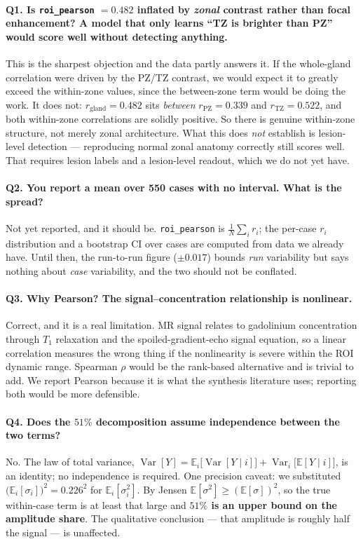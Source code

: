 \documentclass[11pt]{article}
\newcommand{\Var}{\operatorname{Var}}
\newcommand{\Ex}{\mathbb{E}}
\newcommand{\1}{\mathbb{1}}
\begin{document}
\paragraph{Q1. Is \texttt{roi\_pearson} $=0.482$ inflated by \emph{zonal} contrast rather
than focal enhancement? A model that only learns ``TZ is brighter than PZ'' would score well
without detecting anything.}
This is the sharpest objection and the data partly answers it. If the whole-gland correlation
were driven by the PZ/TZ contrast, we would expect it to greatly exceed the within-zone
values, since the between-zone term would be doing the work. It does not:
$r_{\text{gland}}=0.482$ sits \emph{between} $r_{\text{PZ}}=0.339$ and $r_{\text{TZ}}=0.522$,
and both within-zone correlations are solidly positive. So there is genuine within-zone
structure, not merely zonal architecture. What this does \emph{not} establish is
lesion-level detection --- reproducing normal zonal anatomy correctly still scores well.
That requires lesion labels and a lesion-level readout, which we do not yet have.

\paragraph{Q2. You report a mean over 550 cases with no interval. What is the spread?}
Not yet reported, and it should be. \texttt{roi\_pearson} is $\tfrac1N\sum_i r_i$; the
per-case $r_i$ distribution and a bootstrap CI over cases are computed from data we already
have. Until then, the run-to-run figure ($\pm0.017$) bounds \emph{run} variability but says
nothing about \emph{case} variability, and the two should not be conflated.

\paragraph{Q3. Why Pearson? The signal--concentration relationship is nonlinear.}
Correct, and it is a real limitation. MR signal relates to gadolinium concentration through
$T_1$ relaxation and the spoiled-gradient-echo signal equation, so a linear correlation
measures the wrong thing if the nonlinearity is severe within the ROI dynamic range. Spearman
$\rho$ would be the rank-based alternative and is trivial to add. We report Pearson because
it is what the synthesis literature uses; reporting both would be more defensible.

\paragraph{Q4. Does the $51\%$ decomposition assume independence between the two terms?}
No. The law of total variance,
$\Var[Y]=\Ex_i\!\bigl[\Var[Y\mid i]\bigr]+\Var_i\!\bigl[\Ex[Y\mid i]\bigr]$, is an identity;
no independence is required. One precision caveat: we substituted
$\bigl(\Ex_i[\sigma_i]\bigr)^2=0.226^2$ for $\Ex_i[\sigma_i^2]$. By Jensen
$\Ex[\sigma^2]\ge(\Ex[\sigma])^2$, so the true within-case term is at least that large and
\textbf{$51\%$ is an upper bound on the amplitude share}. The qualitative conclusion --- that
amplitude is roughly half the signal --- is unaffected.
\end{document}
